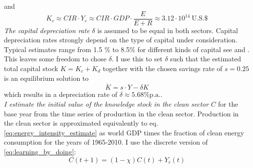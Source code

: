 and 
\begin{equation}
  K_c \approx CIR \cdot Y_c \approx CIR \cdot GDP \cdot \frac{E}{E + R} \approx 3.12 \cdot 10^{14} ~ \textrm{U.S.} \$
  \label{eq:approx_clean_capital}
\end{equation}
\textit{The capital depreciation rate $\delta$} is assumed to be equal in both sectors. Capital depreciation rates strongly depend on the type of capital under consideration. Typical estimates range from 1.5 \% to 8.5\% for different kinds of capital see \cite{Kamps2005} and \cite{Gupta2014}. This leaves some freedom to chose $\delta$. I use this to set $\delta$ such that the estimated total capital stock $K = K_c + K_d$ together with the chosen savings rate of $s=0.25$ is an equilibrium solution to 
\begin{equation}
  \dot{K} = s \cdot Y - \delta K
  \label{eq:delta_estimate}
\end{equation} 
which results in a depreciation rate of $\delta\approx 5.68 \% \mathrm{p.a.}$.\\

\textit{I estimate the initial value of the knowledge stock in the clean sector $C$} for the base year from the time series of production in the clean sector. Production in the clean sector is approximated equivalently to eq. \ref{eq:energy_intensity_estimate} as world GDP times the fraction of clean energy consumption for the years of 1965-2010. I use the discrete version of \eqref{eq:learning_by_doing}:
\begin{equation} 
  C(t+1) = (1-\chi)C(t) + Y_c(t)
  \label{eq:discrete_clean_knowledge}
\end{equation}

